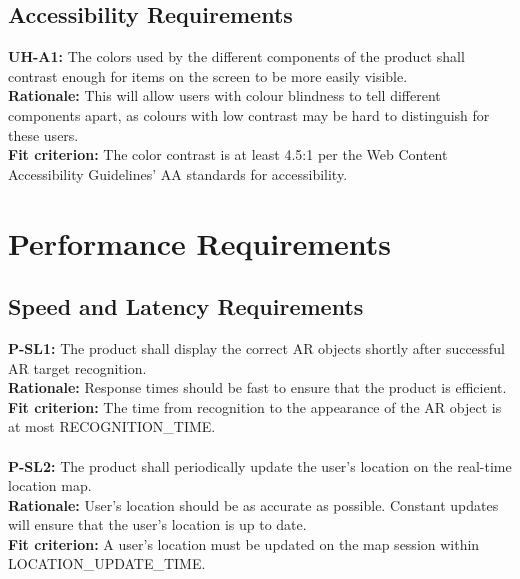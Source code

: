 \documentclass[12pt]{article}
\begin{document}
\subsection{Accessibility Requirements}
  \textbf{UH-A1:} The colors used by the different components of the product shall contrast enough for items on the screen to be more easily visible.\\
  \textbf{Rationale:} This will allow users with colour blindness to tell different components apart, as colours with low contrast may be hard to distinguish for these users.\\
  \textbf{Fit criterion:} The color contrast is at least 4.5:1 per the Web Content Accessibility Guidelines’ AA standards for accessibility\cite{WCAG}.\\

\section{Performance Requirements}
\subsection{Speed and Latency Requirements}
  \textbf{P-SL1:} The product shall display the correct AR objects shortly after successful AR target recognition.\\
  \textbf{Rationale:} Response times should be fast to ensure that the product is efficient.\\
  \textbf{Fit criterion:} The time from recognition to the appearance of the AR object is at most RECOGNITION\_TIME.\\\\
  \textbf{P-SL2:} The product shall periodically update the user’s location on the real-time location map.\\
  \textbf{Rationale:} User's location should be as accurate as possible. Constant updates will ensure that the user's location is up to date.\\
  \textbf{Fit criterion:} A user’s location must be updated on the map session within LOCATION\_UPDATE\_TIME.\\
\end{document}
